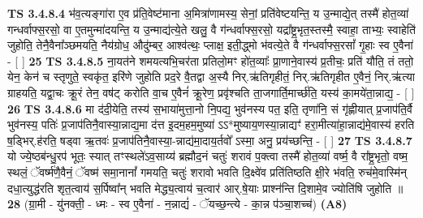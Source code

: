 \documentclass[17pt]{extarticle}
\begin{document}
                  \newline
                                \textbf{ TS 3.4.8.4} \newline
                  भ॑व॒त्यङ्गा॑रा ए॒व प्र॑ति॒वेष्ट॑माना अ॒मित्रा॑णामस्य॒ सेनां॒ प्रति॑वेष्टयन्ति॒ य उ॒न्माद्ये॒त् तस्मै॑ होत॒व्या॑ गन्धर्वाफ्स॒रसो॒ वा ए॒तमुन्मा॑दयन्ति॒ य उ॒न्माद्य॑त्ये॒ते खलु॒ वै ग॑न्धर्वाफ्स॒रसो॒ यद्रा᳚ष्ट्र॒भृत॒स्तस्मै॒ स्वाहा॒ ताभ्यः॒ स्वाहेति॑ जुहोति॒ तेनै॒वैना᳚ञ्छमयति॒ नैय॑ग्रोध॒ औदु॑म्बर॒ आश्व॑त्थः॒ प्लाक्ष॒ इती॒द्ध्मो भ॑वत्ये॒ते वै ग॑न्धर्वाफ्स॒रसां᳚ गृ॒हाः स्व ए॒वैना॑ - [  ] \textbf{  25} \newline
                  \newline
                                \textbf{ TS 3.4.8.5} \newline
                  ना॒यत॑ने शमयत्यभि॒चर॑ता प्रतिलो॒मꣳ हो॑त॒व्याः᳚ प्रा॒णाने॒वास्य॑ प्र॒तीचः॒ प्रति॑ यौति॒ तं ततो॒ येन॒ केन॑ च स्तृणुते॒ स्वकृ॑त॒ इरि॑णे जुहोति प्रद॒रे वै॒तद्वा अ॒स्यै निर्.ऋ॑तिगृहीतं॒ निर्.ऋ॑तिगृहीत ए॒वैनं॒ निर्.ऋ॑त्या ग्राहयति॒ यद्वा॒चः क्रू॒रं तेन॒ वष॑ट् करोति वा॒च ए॒वैनं॑ क्रू॒रेण॒ प्रवृ॑श्चति ता॒जगार्ति॒मार्च्छ॑ति॒ यस्य॑ का॒मये॑ता॒न्नाद्य॒ - [  ] \textbf{  26} \newline
                  \newline
                                \textbf{ TS 3.4.8.6} \newline
                  मा द॑दी॒येति॒ तस्य॑ स॒भाया॑मुत्ता॒नो नि॒पद्य॒ भुव॑नस्य पत॒ इति॒ तृणा॑नि॒ सं गृ॑ह्णीयात् प्र॒जाप॑ति॒र्वै भुव॑नस्य॒ पतिः॑ प्र॒जाप॑तिनै॒वास्या॒न्नाद्य॒मा द॑त्त इ॒दम॒हम॒मुष्या॑ ऽऽ*मुष्याय॒णस्या॒न्नाद्यꣳ॑ हरा॒मीत्या॑हा॒न्नाद्य॑मे॒वास्य॑ हरति ष॒ड्भिर्.ह॑रति॒ षड्वा ऋ॒तवः॑ प्र॒जाप॑तिनै॒वास्या॒-न्नाद्य॑मा॒दाय॒र्तवो᳚ ऽस्मा॒ अनु॒ प्रय॑च्छन्ति॒ - [  ] \textbf{  27} \newline
                  \newline
                                \textbf{ TS 3.4.8.7} \newline
                  यो ज्ये॒ष्ठब॑न्धु॒रप॑ भूतः॒ स्यात् तꣳस्थले॑ऽव॒साय्य॑ ब्रह्मौद॒नं चतुः॑ शरावं प॒क्त्वा तस्मै॑ होत॒व्या॑ वर्ष्म॒ वै रा᳚ष्ट्र॒भृतो॒ वष्म॒ स्थलं॒ ॅवर्ष्म॑णै॒वैनं॒ ॅवष्म॑ समा॒नानां᳚ गमयति॒ चतुः॑ शरावो भवति दि॒क्ष्वे॑व प्रति॑तिष्ठति क्षी॒रे भ॑वति॒ रुच॑मे॒वास्मि॑न् दधा॒त्युद्ध॑रति शृत॒त्वाय॑ स॒र्पिष्वा᳚न् भवति मेद्ध्य॒त्वाय॑ च॒त्वार॑ आर्.षे॒याः प्राश्न॑न्ति दि॒शामे॒व ज्योति॑षि जुहोति ॥ \textbf{  28} \newline
                  \newline
                      (ग्रा॒मी - यु॑नक्ती॒ - ध्मः - स्व ए॒वैना॑ - न॒न्नाद्यं॑ - ॅयच्छ॒न्त्ये - का॒न्न प॑ञ्चा॒शच्च॑)  \textbf{(A8)} \newline \newline
\end{document}
